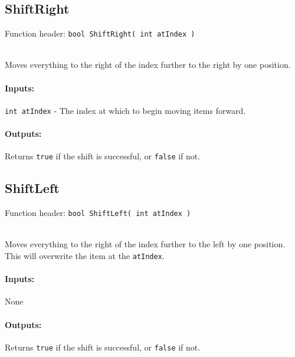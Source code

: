     \begin{framed}
    \subsection{ShiftRight}

    Function header: \texttt{bool ShiftRight( int atIndex )}

    ~\\ Moves everything to the right of the index further to the right by one position.

    \paragraph{Inputs:}
        \texttt{int atIndex} - The index at which to begin moving items forward.

    \paragraph{Outputs:}
        Returns \texttt{true} if the shift is successful, or \texttt{false} if not.

    \end{framed}
    
    \begin{framed}
    \subsection{ShiftLeft}

    Function header: \texttt{bool ShiftLeft( int atIndex )}

    ~\\ Moves everything to the right of the index further to the left by one position.
    This will overwrite the item at the \texttt{atIndex}.

    \paragraph{Inputs:}
        None

    \paragraph{Outputs:}
        Returns \texttt{true} if the shift is successful, or \texttt{false} if not.

    \end{framed}
    

